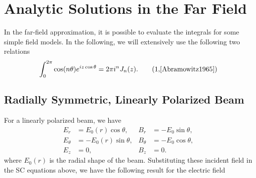 \documentclass[11pt,SymmetricalJury]{inrsthesis/inrsthesis}
\begin{document}
\section{Analytic Solutions in the Far Field}
In the far-field approximation, it is possible to evaluate the integrals
for some simple field models. In the following, we will extensively use the
following two relations
  \begin{equation}
    \stepcounter{equation}
    \int_0^{2\pi} \cos(n\theta)e^{iz\cos\theta}= 2\pi i^n J_n(z). \tag{\theequation,\cite[\S9.1.21]{Abramowitz1965}}
  \end{equation}

\subsection{Radially Symmetric, Linearly Polarized Beam}
For a linearly polarized beam, we have
  \begin{subequations}
  \begin{align}
    E_r       &= E_0(r)\cos\theta ,  & B_r      &= -E_0\sin\theta, \\
    E_\theta  &= -E_0(r)\sin\theta,  & B_\theta &= -E_0\cos\theta, \\
    E_z       &= 0                ,  & B_z      &=  0.
  \end{align}
  \end{subequations}
where $E_0(r)$ is the radial shape of the beam.
Substituting these incident field in the SC equations above, we have the following
result for the electric field
\end{document}
